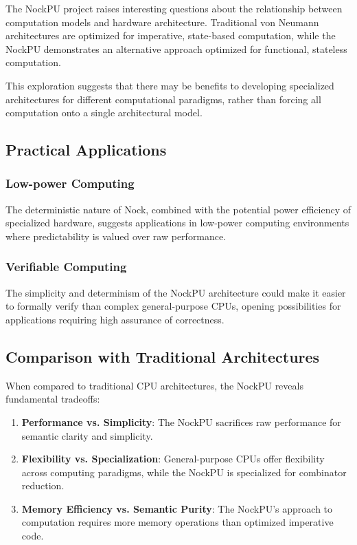 \documentclass[twoside]{article}
\begin{document}
The NockPU project raises interesting questions about the relationship between computation models and hardware architecture. Traditional von Neumann architectures are optimized for imperative, state-based computation, while the NockPU demonstrates an alternative approach optimized for functional, stateless computation.

This exploration suggests that there may be benefits to developing specialized architectures for different computational paradigms, rather than forcing all computation onto a single architectural model.

\subsection{Practical Applications}

\subsubsection{Low-power Computing}

The deterministic nature of Nock, combined with the potential power efficiency of specialized hardware, suggests applications in low-power computing environments where predictability is valued over raw performance.

\subsubsection{Verifiable Computing}

The simplicity and determinism of the NockPU architecture could make it easier to formally verify than complex general-purpose CPUs, opening possibilities for applications requiring high assurance of correctness.

\subsection{Comparison with Traditional Architectures}

When compared to traditional CPU architectures, the NockPU reveals fundamental tradeoffs:

\begin{enumerate}
  \item \textbf{Performance vs. Simplicity}: The NockPU sacrifices raw performance for semantic clarity and simplicity.
  \item \textbf{Flexibility vs. Specialization}: General-purpose CPUs offer flexibility across computing paradigms, while the NockPU is specialized for combinator reduction.
  \item \textbf{Memory Efficiency vs. Semantic Purity}: The NockPU's approach to computation requires more memory operations than optimized imperative code.
\end{enumerate}
\end{document}
